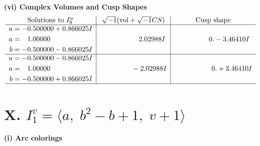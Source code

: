\documentclass[1p]{elsarticle_modified}
\theoremstyle{definition}
\newcommand{\I}{\sqrt{-1}}
\begin{document}
\newpage\flushleft \textbf{(vi) Complex Volumes and Cusp Shapes}
$$\begin{array}{c|c|c}  
\text{Solutions to }I^u_{9}& \I (\text{vol} + \sqrt{-1}CS) & \text{Cusp shape}\\
 \hline 
\begin{aligned}
u &= -0.500000 + 0.866025 I \\
a &= \phantom{-}1.00000\phantom{ +0.000000I} \\
b &= -0.500000 - 0.866025 I\end{aligned}
 & \phantom{-0.000000 -}2.02988 I & \phantom{-0.000000 } 0. - 3.46410 I \\ \hline\begin{aligned}
u &= -0.500000 - 0.866025 I \\
a &= \phantom{-}1.00000\phantom{ +0.000000I} \\
b &= -0.500000 + 0.866025 I\end{aligned}
 & \phantom{-0.000000 } -2.02988 I & \phantom{-0.000000 -}0. + 3.46410 I\\
 \hline 
 \end{array}$$\newpage\newpage\renewcommand{\arraystretch}{1}
\centering \section*{X. $I^v_{1}= \langle a,\;b^2- b+1,\;v+1 \rangle$}
\flushleft \textbf{(i) Arc colorings}\\
\end{document}
